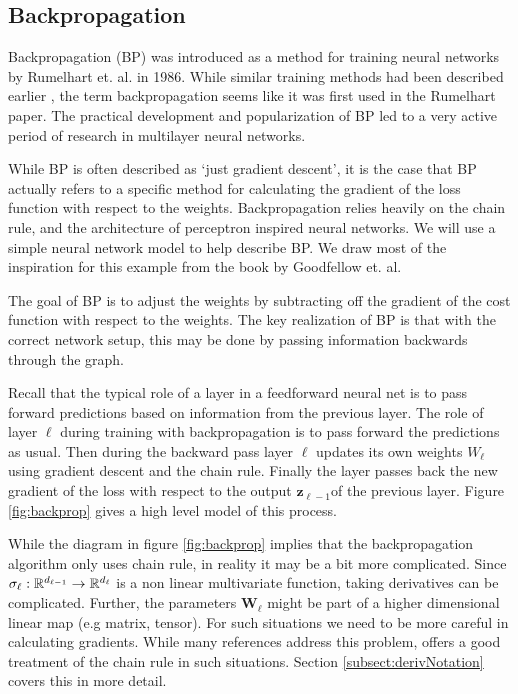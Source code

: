 \subsection{Backpropagation}\label{subsect:backprop}
Backpropagation (BP) was introduced as a method for training neural networks by Rumelhart et. al. \cite{rumelhart1986learning} in 1986.  While similar training methods had been described earlier \cite[see ch6.6]{Goodfellow-et-al-2016}, the term backpropagation seems like it was first used in the Rumelhart paper.  The practical development and popularization of BP led to a very active period of research in multilayer neural networks.

While BP is often described as `just gradient descent', it is the case that BP actually refers to a specific method for calculating the gradient of the loss function with respect to the weights.  Backpropagation relies heavily on the chain rule, and the architecture of perceptron inspired neural networks. We will use a simple neural network model to help describe BP.  We draw most of the inspiration for this example from the book by Goodfellow  et. al. \cite[ch6.5]{Goodfellow-et-al-2016}

The goal of BP is to adjust the weights by subtracting off the gradient of the cost function with respect to the weights.  The key realization of BP is that with the correct network setup, this may be done by passing information backwards through the graph.  

Recall that the typical role of a layer in a feedforward neural net is to pass forward predictions based on information from the previous layer.  The role of layer \( \ell \) during training with backpropagation is to pass forward the predictions as usual. Then during the backward pass layer \( \ell \) updates its own weights \( W_{\ell} \) using gradient descent and the chain rule. Finally the layer passes back the new gradient of the loss with respect to the output \( \bm z_{\ell-1} \)of the previous layer.  Figure \ref{fig:backprop} gives a high level model of this process.



While the diagram in figure \ref{fig:backprop} implies that the backpropagation algorithm only uses chain rule, in reality it may be a bit more complicated.  Since \( \sigma_{\ell}:\mathbb R^{d_{\ell-1}}\rightarrow \mathbb R^{d_{\ell}}\) is a non linear multivariate function, taking derivatives can be complicated.  Further, the parameters \( \bm W_{\ell} \) might be part of a higher dimensional linear map (e.g matrix, tensor). For such situations we need to be more careful in calculating gradients.  While many references address this problem, \cite{matGradChain} offers a good treatment of the chain rule in such situations. Section \ref{subsect:derivNotation} covers this in more detail.

